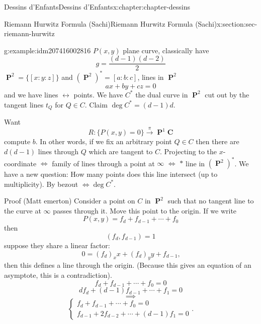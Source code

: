 \documentclass[oneside,10pt,]{book}
\numberwithin{equation}{section}
\newcommand{\lb}{[}
\newcommand{\rb}{]}
\newcommand{\CC}{\mathbf{C}}
\DeclareMathOperator{\PP}{\mathbf{P}}
\begin{document}
\begin{chapterptx}{Dessins d'Enfants}{}{Dessins d'Enfants}{}{}{x:chapter:chapter-dessins}
\begin{sectionptx}{Riemann Hurwitz Formula (Sachi)}{}{Riemann Hurwitz Formula (Sachi)}{}{}{x:section:sec-riemann-hurwitz}
\begin{example}{}{g:example:idm207416002816}%
\(P(x,y)\) plane curve, classically have%
\begin{equation*}
g = \frac{(d-1)(d-2)}{2}
\end{equation*}
\(\PP^2 = \{ \lb x:y:z \rb\}\) and \((\PP^2)^* = \lb a:b:c \rb\), lines in \(\PP^2\)%
\begin{equation*}
ax + by + cz = 0
\end{equation*}
and we have lines \(\leftrightarrow\) points. We have \(C^*\) the dual curve in \(\PP^2\) cut out by the tangent lines \(t_Q\) for \(Q \in C\). Claim \(\deg C^* = (d-1)d\).%
\par
Want%
\begin{equation*}
R:\{P(x,y) = 0\} \xrightarrow\pi \PP^1\CC
\end{equation*}
compute \(b\). In other words, if we fix an arbitrary point \(Q\in C\) then there are \(d(d-1)\) lines through \(Q\) which are tangent to \(C\). Projecting to the \(x\)-coordinate \(\iff\) family of lines through a point at \(\infty\) \(\iff\) \(\ast\) line in \((\PP^2)^*\). We have a new question: How many points does this line intersect (up to multiplicity). By bezout \(\iff  \deg C^*\).%
\par
Proof (Matt emerton) Consider a point on \(C\) in \(\PP^2\) such that no tangent line to the curve at   \(\infty\) passes through it. Move this point to the origin. If we write%
\begin{equation*}
P(x,y) = f_d + f_{d-1} + \cdots + f_0
\end{equation*}
then%
\begin{equation*}
(f_d, f_{d-1}) = 1
\end{equation*}
suppose they share a linear factor:%
\begin{equation*}
0 = (f_d)_x x + (f_d)_y y + f_{d-1}\text{,}
\end{equation*}
then this defines a line through the origin. (Because this gives an equation of an asymptote, this is a contradiction).%
\begin{equation*}
f_d + f_{d-1} + \cdots + f_0 = 0
\end{equation*}
%
\begin{equation*}
d f_d + (d-1) f_{d-1} + \cdots + f_1 = 0
\end{equation*}
%
\begin{equation*}
\implies
\end{equation*}
%
\begin{equation*}
\begin{cases}  f_d + f_{d-1} + \cdots + f_0 = 0 \\ f_{d-1} + 2f_{d-2} + \cdots + (d-1) f_1 = 0\end{cases}\text{.}

\end{equation*}
\end{example}
\end{sectionptx}
\end{chapterptx}
\end{document}
